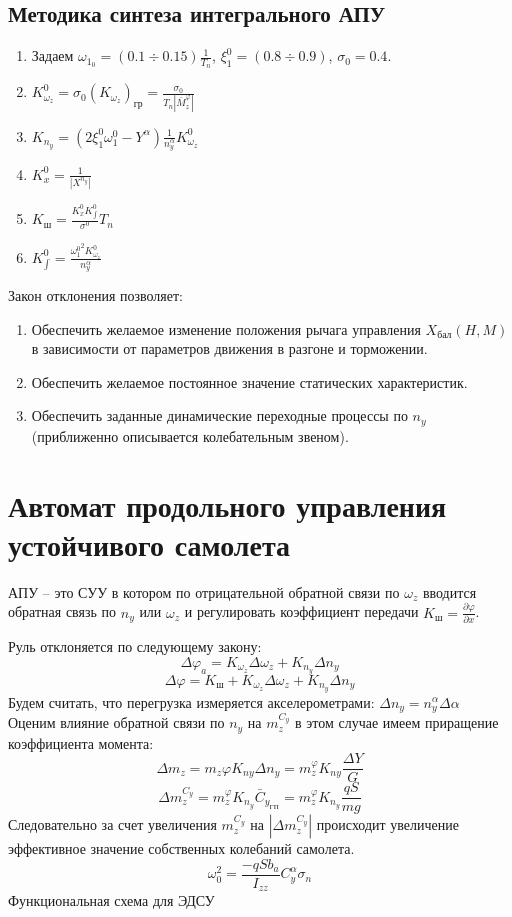 \documentclass{article}
\begin{document}
\subsection{Методика синтеза интегрального АПУ}
\begin{enumerate}
	\item Задаем $\omega_{{1}_{0}} = (0.1 \div 0.15) \frac{1}{T_n}$, $\xi_1^0 =
		      (0.8 \div 0.9)$, $\sigma_0 = 0.4$.
	\item $K_{\omega_z}^0 = \sigma_0 (K_{\omega_z})_\text{гр} =
		      \frac{\sigma_0}{T_n|\bar{M}_z^\varphi|}$
	\item $K_{n_y} = (2\xi_1^0 \omega_1^0 - Y^\alpha)\frac{1}{n_y^\alpha}
		      K_{\omega_z}^0$
	\item $K_x^0 = \frac{1}{|X^{n_y}|}$
	\item $K_\text{ш} = \frac{K_x^0 K_{\int}^0}{\sigma^0}T_n$
	\item $K_{\int}^0 = \frac{{\omega_1^0}^2 K_{\omega_z}^0}{n_y^\alpha}$
\end{enumerate}
Закон отклонения позволяет:
\begin{enumerate}
	\item Обеспечить желаемое изменение положения рычага управления
	      $X_\text{бал}(H,M)$ в зависимости от параметров движения в разгоне и
	      торможении.
	\item Обеспечить желаемое постоянное значение статических характеристик.
	\item Обеспечить заданные динамические переходные процессы по $n_y$
	      (приближенно описывается колебательным звеном).
\end{enumerate}
\section{Автомат продольного управления устойчивого самолета}
АПУ -- это СУУ в котором по отрицательной обратной связи по $\omega_z$ вводится
обратная связь по $n_y$ или $\omega_z$ и регулировать коэффициент передачи
$K_\text{ш}=\frac{\partial \varphi}{\partial x}$.

Руль отклоняется по следующему закону:
\[
	\Delta \varphi_a  = K_{\omega_z} \Delta \omega_z + K_{n_y} \Delta n_y
\]
\[
	\Delta \varphi = K_\text{ш} + K_{\omega_z}\Delta \omega_z + K_{n_y} \Delta
	n_y
\]
Будем считать, что перегрузка измеряется акселерометрами: $\Delta n_y =
	n_y^\alpha \Delta \alpha$
Оценим влияние обратной связи по $n_y$ на $m_z^{C_y}$ в этом случае имеем
приращение коэффициента момента:
\[
	\Delta m_z = m_z \varphi K_{ny}\Delta n_y = m_z^\varphi K_{ny} \frac{\Delta
		Y}{G}
\]
\[
	\Delta m_z^{C_y} = m_z^\varphi K_{n_y} \bar{C}_{y_\text{ГП}} = m_z^\varphi
	K_{n_y} \frac{qS}{mg}
\]
Следовательно за счет увеличения $m_z^{C_y}$ на $|\Delta m_z^{C_y}|$ происходит
увеличение эффективное значение собственных колебаний самолета.
\[
	\omega_0^2 = \frac{-qS b_a}{I_{zz}} C_y^\alpha \sigma_n
\]
Функциональная схема для ЭДСУ
\end{document}
